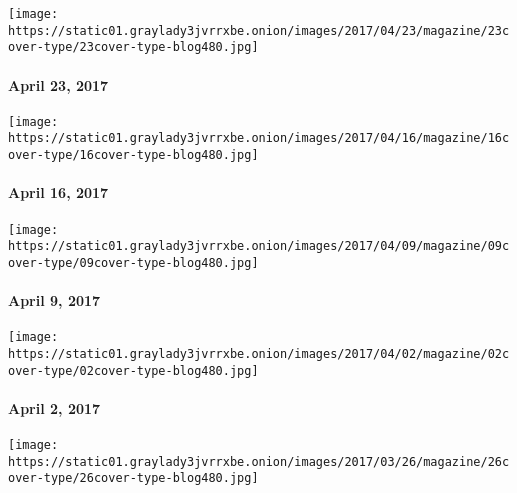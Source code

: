 \href{https://www.nytimes3xbfgragh.onion/issue/magazine/2017/04/21/magazine-index-20170423}{}

\texttt{[image: https://static01.graylady3jvrrxbe.onion/images/2017/04/23/magazine/23cover-type/23cover-type-blog480.jpg]}

\hypertarget{april-23-2017}{%
\paragraph{April 23, 2017}\label{april-23-2017}}

\href{https://www.nytimes3xbfgragh.onion/issue/magazine/2017/04/14/magazine-index-20170416}{}

\texttt{[image: https://static01.graylady3jvrrxbe.onion/images/2017/04/16/magazine/16cover-type/16cover-type-blog480.jpg]}

\hypertarget{april-16-2017}{%
\paragraph{April 16, 2017}\label{april-16-2017}}

\href{https://www.nytimes3xbfgragh.onion/issue/magazine/2017/04/07/magazine-index-20170409}{}

\texttt{[image: https://static01.graylady3jvrrxbe.onion/images/2017/04/09/magazine/09cover-type/09cover-type-blog480.jpg]}

\hypertarget{april-9-2017}{%
\paragraph{April 9, 2017}\label{april-9-2017}}

\href{https://www.nytimes3xbfgragh.onion/issue/magazine/2017/03/31/magazine-index-20170402}{}

\texttt{[image: https://static01.graylady3jvrrxbe.onion/images/2017/04/02/magazine/02cover-type/02cover-type-blog480.jpg]}

\hypertarget{april-2-2017}{%
\paragraph{April 2, 2017}\label{april-2-2017}}

\href{https://www.nytimes3xbfgragh.onion/issue/magazine/2017/03/24/magazine-index-20170326}{}

\texttt{[image: https://static01.graylady3jvrrxbe.onion/images/2017/03/26/magazine/26cover-type/26cover-type-blog480.jpg]}

